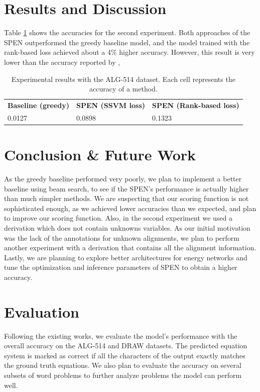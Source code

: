 \documentclass[11pt,letterpaper]{article}
\begin{document}
\section{Results and Discussion}
Table \ref{result} shows the accuracies for the second experiment. Both approaches of the SPEN outperformed the greedy baseline model, and the model trained with the rank-based loss achieved about a 4\% higher accuracy. However, this result is very lower than the accuracy reported by \cite{Kushman2014LearningTA},
\begin{table}[htbp]
\centering
\caption{Experimental results with the ALG-514 dataset. Each cell represents the accuracy of a method.}
\label{result}
\begin{tabular}{lll}
\textbf{Baseline (greedy)} & \textbf{SPEN (SSVM loss)} & \textbf{SPEN (Rank-based loss)} \\
0.0127                     & 0.0898                    & 0.1323                         
\end{tabular}
\end{table}
\section{Conclusion \& Future Work}
As the greedy baseline performed very poorly, we plan to implement a better baseline using beam search, to see if the SPEN's performance is actually higher than much simpler methods. We are suspecting that our scoring function is not sophisticated enough, as we achieved lower accuracies than we expected, and plan to improve our scoring function. Also, in the second experiment we used a derivation which does not contain unknowns variables. As our initial motivation was the lack of the annotations for unknown alignments, we plan to perform another experiment with a derivation that contains all the alignment information. Lastly, we are planning to explore better architectures for energy networks and tune the optimization and inference parameters of SPEN to obtain a higher accuracy.
\section{Evaluation}
Following the existing works, we evaluate the model's performance with the overall accuracy on the ALG-514 and DRAW datasets. The predicted equation system is marked as correct if all the characters of the output exactly matches the ground truth equations. We also plan to evaluate the accuracy on several subsets of word problems to further analyze problems the model can perform well.
\end{document}
